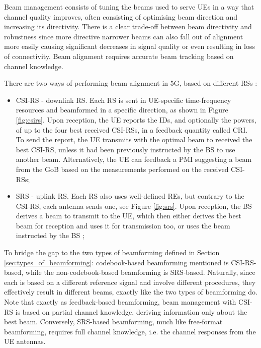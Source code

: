 Beam management consists of tuning the beams used to serve UEs in a way that channel quality improves, often consisting of optimising beam direction and increasing its directivity. There is a clear trade-off between beam directivity and robustness since more directive narrower beams can also fall out of alignment more easily causing significant decreases in signal quality or even resulting in loss of connectivity. Beam alignment requires accurate beam tracking based on channel knowledge.

There are two ways of performing beam alignment in \ac{5G}, based on different \acp{RS} \cite{beam_management}: 


\begin{itemize}
    \item \ac{CSI-RS} - downlink \ac{RS}. Each RS is sent in UE-specific time-frequency resources and beamformed in a specific direction, as shown in Figure \ref{fig:csirs}. Upon reception, the UE reports the IDs, and optionally the powers, of up to the four best received CSI-RSs, in a feedback quantity called \ac{CRI}. To send the report, the UE transmits with the optimal beam to received the best CSI-RS, unless it had been previously instructed by the BS to use another beam. Alternatively, the UE can feedback a \ac{PMI} suggesting a beam from the GoB based on the measurements performed on the received CSI-RSs;
    \item \ac{SRS} - uplink \ac{RS}. Each RS also uses well-defined \acsp{RE}, but contrary to the \acs{CSI-RS}, each antenna sends one, see Figure \ref{fig:srs}. Upon reception, the BS derives a beam to transmit to the UE, which then either derives the best beam for reception and uses it for transmission too, or uses the beam instructed by the BS \cite{DAHLMAN2018};
\end{itemize}


To bridge the gap to the two types of beamforming defined in Section \ref{sec:types_of_beamforming}: codebook-based beamforming mentioned is CSI-RS-based, while the non-codebook-based beamforming is SRS-based. Naturally, since each is based on a different reference signal and involve different procedures, they effectively result in different beams, exactly like the two types of beamforming do. Note that exactly as feedback-based beamforming, beam management with CSI-RS is based on partial channel knowledge, deriving information only about the best beam. Conversely, SRS-based beamforming, much like free-format beamforming, requires full channel knowledge, i.e. the channel responses from the \ac{UE} antennas.

